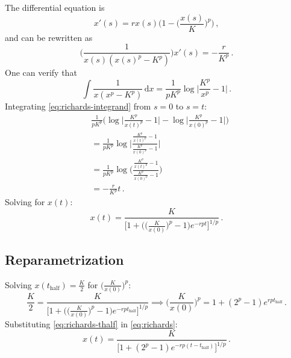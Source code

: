 \documentclass[12pt]{article}
\begin{document}
The differential equation is
%
\begin{equation}
  x'(s) = r x(s) \bigg(1 - \bigg(\frac{x(s)}{K}\bigg)^p\bigg)\,,
\end{equation}
%
and can be rewritten as
%
\begin{equation}
  \label{eq:richards-integrand}
  \bigg(\frac{1}{x(s) (x(s)^p - K^p)}\bigg) x'(s) = -\frac{r}{K^p}\,.
\end{equation}
%
One can verify that
%
\begin{equation}
  \int \frac{1}{x (x^p - K^p)}\,\text{d}x = \frac{1}{p K^p} \log\bigg|\frac{K^p}{x^p} - 1\bigg|\,.
\end{equation}
%
Integrating \eqref{eq:richards-integrand} from $s = 0$ to $s = t$:
%
\begin{equation}
  \begin{aligned}
    &\frac{1}{p K^p} \Bigg(\log\bigg|\frac{K^p}{x(t)^p} - 1\bigg| - \log\bigg|\frac{K^p}{x(0)^p} - 1\bigg|\Bigg) \\
    &= \frac{1}{p K^p} \log\Bigg|\frac{\frac{K^p}{x(t)^p} - 1}{\frac{K^p}{x(0)^p} - 1}\Bigg| \\
    &= \frac{1}{p K^p} \log\Bigg(\frac{\frac{K^p}{x(t)^p} - 1}{\frac{K^p}{x(0)^p} - 1}\Bigg) \\
    &= -\frac{r}{K^p}t\,.
  \end{aligned}
\end{equation}
%
Solving for $x(t)$:
%
\begin{equation}
  \label{eq:richards}
  x(t) = \frac{K}{\big[1 + \big(\big(\frac{K}{x(0)}\big)^p - 1\big) e^{-r p t}\big]^{1/p}}\,.
\end{equation}

\subsection{Reparametrization}

Solving $x(t_\text{half}) = \frac{K}{2}$ for $\big(\frac{K}{x(0)}\big)^p$:
%
\begin{equation}
  \label{eq:richards-thalf}
  \frac{K}{2} = \frac{K}{\big[1 + \big(\big(\frac{K}{x(0)}\big)^p - 1\big) e^{-r p t_\text{half}}\big]^{1/p}} \implies \bigg(\frac{K}{x(0)}\bigg)^p = 1 + (2^p - 1) e^{r p t_\text{half}}\,.
\end{equation}
%
Substituting \eqref{eq:richards-thalf} in \eqref{eq:richards}:
%
\begin{equation}
  x(t) = \frac{K}{\big[1 + (2^p - 1) e^{-r p (t - t_\text{half})}\big]^{1/p}}\,.
\end{equation}
\end{document}
